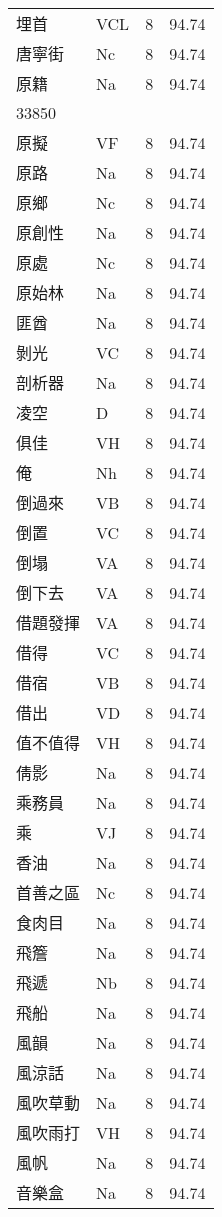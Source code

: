 \documentclass[twocolumn]{book}
\begin{document}
\begin{supertabular}{llrr}
埋首 & VCL & 8 &  94.74\\
唐寧街 & Nc & 8 &  94.74\\
原籍 & Na & 8 &  94.74\\
33850\\
原擬 & VF & 8 &  94.74\\
原路 & Na & 8 &  94.74\\
原鄉 & Nc & 8 &  94.74\\
原創性 & Na & 8 &  94.74\\
原處 & Nc & 8 &  94.74\\
原始林 & Na & 8 &  94.74\\
匪酋 & Na & 8 &  94.74\\
剝光 & VC & 8 &  94.74\\
剖析器 & Na & 8 &  94.74\\
凌空 & D & 8 &  94.74\\
俱佳 & VH & 8 &  94.74\\
俺 & Nh & 8 &  94.74\\
倒過來 & VB & 8 &  94.74\\
倒置 & VC & 8 &  94.74\\
倒塌 & VA & 8 &  94.74\\
倒下去 & VA & 8 &  94.74\\
借題發揮 & VA & 8 &  94.74\\
借得 & VC & 8 &  94.74\\
借宿 & VB & 8 &  94.74\\
借出 & VD & 8 &  94.74\\
值不值得 & VH & 8 &  94.74\\
倩影 & Na & 8 &  94.74\\
乘務員 & Na & 8 &  94.74\\
乘 & VJ & 8 &  94.74\\
香油 & Na & 8 &  94.74\\
首善之區 & Nc & 8 &  94.74\\
食肉目 & Na & 8 &  94.74\\
飛簷 & Na & 8 &  94.74\\
飛遞 & Nb & 8 &  94.74\\
飛船 & Na & 8 &  94.74\\
風韻 & Na & 8 &  94.74\\
風涼話 & Na & 8 &  94.74\\
風吹草動 & Na & 8 &  94.74\\
風吹雨打 & VH & 8 &  94.74\\
風帆 & Na & 8 &  94.74\\
音樂盒 & Na & 8 &  94.74\\

\end{supertabular}
\end{document}
